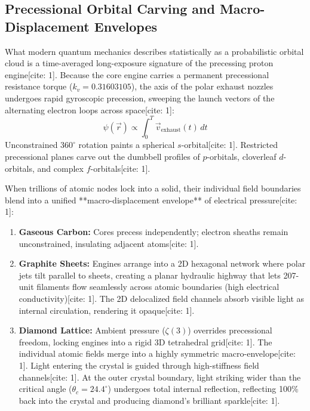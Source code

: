\documentclass[11pt,a4paper]{article}
\begin{document}
	\subsection{Precessional Orbital Carving and Macro-Displacement Envelopes}
	What modern quantum mechanics describes statistically as a probabilistic orbital cloud is a time-averaged long-exposure signature of the precessing proton engine[cite: 1]. Because the core engine carries a permanent precessional resistance torque ($k_v = 0.31603105$), the axis of the polar exhaust nozzles undergoes rapid gyroscopic precession, sweeping the launch vectors of the alternating electron loops across space[cite: 1]:
	\begin{equation}
		\psi(\vec{r}) \propto \int_{0}^{T} \vec{v}_{\text{exhaust}}(t) \, dt
	\end{equation}
	Unconstrained $360^\circ$ rotation paints a spherical $s$-orbital[cite: 1]. Restricted precessional planes carve out the dumbbell profiles of $p$-orbitals, cloverleaf $d$-orbitals, and complex $f$-orbitals[cite: 1].
	
	When trillions of atomic nodes lock into a solid, their individual field boundaries blend into a unified **macro-displacement envelope** of electrical pressure[cite: 1]:
	\begin{enumerate}
		\item \textbf{Gaseous Carbon:} Cores precess independently; electron sheaths remain unconstrained, insulating adjacent atoms[cite: 1].
		\item \textbf{Graphite Sheets:} Engines arrange into a 2D hexagonal network where polar jets tilt parallel to sheets, creating a planar hydraulic highway that lets 207-unit filaments flow seamlessly across atomic boundaries (high electrical conductivity)[cite: 1]. The 2D delocalized field channels absorb visible light as internal circulation, rendering it opaque[cite: 1].
		\item \textbf{Diamond Lattice:} Ambient pressure ($\zeta(3)$) overrides precessional freedom, locking engines into a rigid 3D tetrahedral grid[cite: 1]. The individual atomic fields merge into a highly symmetric macro-envelope[cite: 1]. Light entering the crystal is guided through high-stiffness field channels[cite: 1]. At the outer crystal boundary, light striking wider than the critical angle ($\theta_c = 24.4^\circ$) undergoes total internal reflection, reflecting 100\% back into the crystal and producing diamond's brilliant sparkle[cite: 1].
	\end{enumerate}
	
\end{document}
